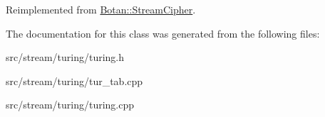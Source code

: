 Reimplemented from \hyperlink{classBotan_1_1StreamCipher_aeb0aaa9c4248e22c8302b99b2dfa9e8d}{Botan\-::\-Stream\-Cipher}.



The documentation for this class was generated from the following files\-:\begin{DoxyCompactItemize}
\item 
src/stream/turing/turing.\-h\item 
src/stream/turing/tur\-\_\-tab.\-cpp\item 
src/stream/turing/turing.\-cpp\end{DoxyCompactItemize}
